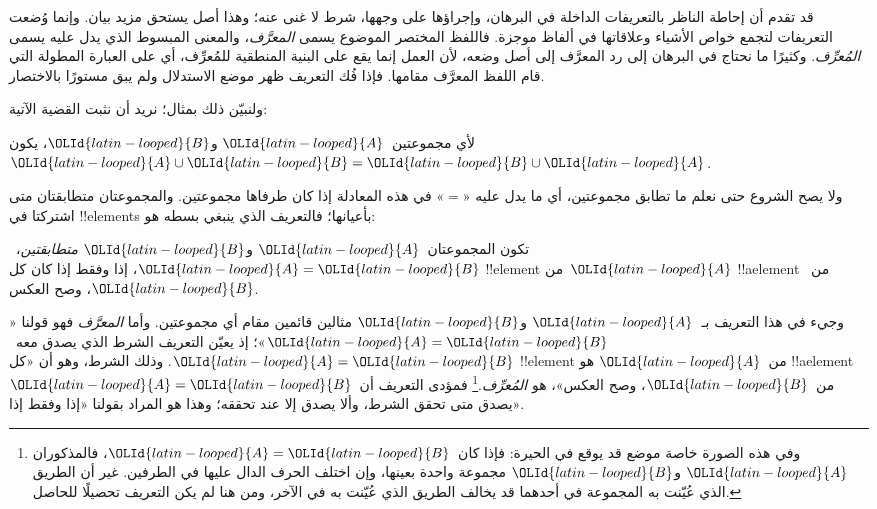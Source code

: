 \documentclass[../../../include/open-logic-section]{subfiles}
\begin{document}


قد تقدم أن إحاطة الناظر بالتعريفات الداخلة في البرهان، وإجراؤها على
وجهها، شرط لا غنى عنه؛ وهذا أصل يستحق مزيد بيان. وإنما وُضعت
التعريفات لتجمع خواص الأشياء وعلاقاتها في ألفاظ موجزة. فاللفظ المختصر
الموضوع يسمى \emph{المعرَّف}، والمعنى المبسوط الذي يدل عليه يسمى
\emph{المُعرِّف}. وكثيرًا ما نحتاج في البرهان إلى رد المعرَّف إلى أصل
وضعه، لأن العمل إنما يقع على البنية المنطقية للمُعرِّف، أي على العبارة
المطولة التي قام اللفظ المعرَّف مقامها. فإذا فُك التعريف ظهر موضع
الاستدلال ولم يبق مستورًا بالاختصار.

ولنبيّن ذلك بمثال؛ نريد أن نثبت القضية الآتية:

\begin{prop}
لأي مجموعتين~$\OLId{latin-looped}{A}$ و$\OLId{latin-looped}{B}$، يكون~$\OLId{latin-looped}{A} \cup \OLId{latin-looped}{B} = \OLId{latin-looped}{B} \cup \OLId{latin-looped}{A}$.
\end{prop}

ولا يصح الشروع حتى نعلم ما تطابق مجموعتين، أي ما يدل عليه «$=$» في
هذه المعادلة إذا كان طرفاها مجموعتين. والمجموعتان متطابقتان متى
اشتركتا في !!{element}s بأعيانها؛ فالتعريف الذي ينبغي بسطه هو:

\begin{defn}
تكون المجموعتان~$\OLId{latin-looped}{A}$ و$\OLId{latin-looped}{B}$ \emph{متطابقتين}،~$\OLId{latin-looped}{A} = \OLId{latin-looped}{B}$، إذا وفقط إذا كان
كل !!{element} من~$\OLId{latin-looped}{A}$ !!a{element} من~$\OLId{latin-looped}{B}$، وصح العكس.
\end{defn}

وجيء في هذا التعريف بـ~$\OLId{latin-looped}{A}$ و$\OLId{latin-looped}{B}$ مثالين قائمين مقام أي مجموعتين. وأما
\emph{المعرَّف} فهو قولنا «$\OLId{latin-looped}{A} = \OLId{latin-looped}{B}$»؛ إذ يعيّن التعريف الشرط الذي يصدق
معه~$\OLId{latin-looped}{A} = \OLId{latin-looped}{B}$. وذلك الشرط، وهو أن «كل !!{element} من~$\OLId{latin-looped}{A}$ هو
!!a{element} من~$\OLId{latin-looped}{B}$، وصح العكس»، هو \emph{المُعرِّف}.\footnote{وفي
هذه الصورة خاصة موضع قد يوقع في الحيرة: فإذا كان~$\OLId{latin-looped}{A} = \OLId{latin-looped}{B}$، فالمذكوران
$\OLId{latin-looped}{A}$ و$\OLId{latin-looped}{B}$ مجموعة واحدة بعينها، وإن اختلف الحرف الدال عليها في الطرفين.
غير أن الطريق الذي عُيّنت به المجموعة في أحدهما قد يخالف الطريق الذي
عُيّنت به في الآخر، ومن هنا لم يكن التعريف تحصيلًا للحاصل.} فمؤدى
التعريف أن~$\OLId{latin-looped}{A} = \OLId{latin-looped}{B}$ يصدق متى تحقق الشرط، وألا يصدق إلا عند تحققه؛ وهذا
هو المراد بقولنا «إذا وفقط إذا».
\end{document}
